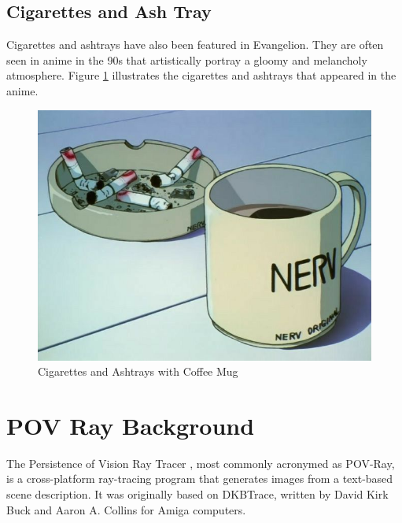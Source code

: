 \documentclass[runningheads]{llncs}
\begin{document}
    
    \subsection{Cigarettes and Ash Tray}
    Cigarettes and ashtrays have also been featured in Evangelion. They are often seen in anime in the 90s that artistically portray a gloomy and melancholy atmosphere. Figure \ref{fig:cigarette} illustrates the cigarettes and ashtrays that appeared in the anime.
    
    \begin{figure}[!htb]
        \centering
        \includegraphics[width=.7\textwidth]{assets/d3820a1d8d6bebd9f0b784e58fc4ac96.jpg}
        \caption{Cigarettes and Ashtrays with Coffee Mug \protect\footnotemark}
        \label{fig:cigarette}
    \end{figure}
    
    
    \section{POV Ray Background}
    The Persistence of Vision Ray Tracer \cite{pov}, most commonly acronymed as POV-Ray, is a cross-platform ray-tracing program that generates images from a text-based scene description. It was originally based on DKBTrace, written by David Kirk Buck and Aaron A. Collins for Amiga computers.
    
\end{document}
